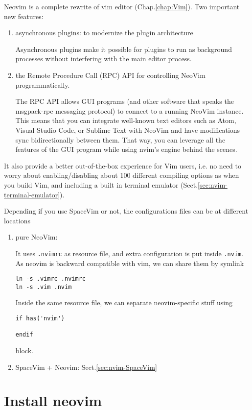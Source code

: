 Neovim is a complete rewrite of vim editor (Chap.\ref{chap:Vim}).
Two important new features:
\begin{enumerate}
  \item  asynchronous plugins: to modernize the plugin architecture


Asynchronous plugins make it possible for plugins to run as background processes
without interfering with the main editor process.
  
  \item the Remote Procedure Call (RPC) API for controlling NeoVim
  programmatically.
  
The RPC API allows GUI programs (and other software that speaks the msgpack-rpc
  messaging protocol) to connect to a running NeoVim instance. This means that
  you can integrate well-known text editors such as Atom, Visual Studio Code, or
  Sublime Text with NeoVim and have modifications sync bidirectionally between
  them. That way, you can leverage all the features of the GUI program while
  using nvim's engine behind the scenes.
  
\end{enumerate}
It also provide a better out-of-the-box experience for Vim users, i.e. no need
to worry about enabling/disabling about 100 different compiling options as when
you build Vim, and including a built in terminal emulator
(Sect.\ref{sec:nvim-terminal-emulator}).

Depending if you use SpaceVim or not, the configurations files
can be at different locations
\begin{enumerate}
  \item pure NeoVim: 

It uses \verb!.nvimrc! as resource file, and extra configuration is put inside
\verb!.nvim!. As neovim is backward compatible with vim, we can share them by
symlink
\begin{verbatim}
ln -s .vimrc .nvimrc
ln -s .vim .nvim
\end{verbatim}

Inside the same resource file, we can separate neovim-specific stuff using 
\begin{verbatim}
if has('nvim') 

endif
\end{verbatim}
block.

   \item SpaceVim + Neovim: Sect.\ref{sec:nvim-SpaceVim}
\end{enumerate}

\section{Install neovim}

